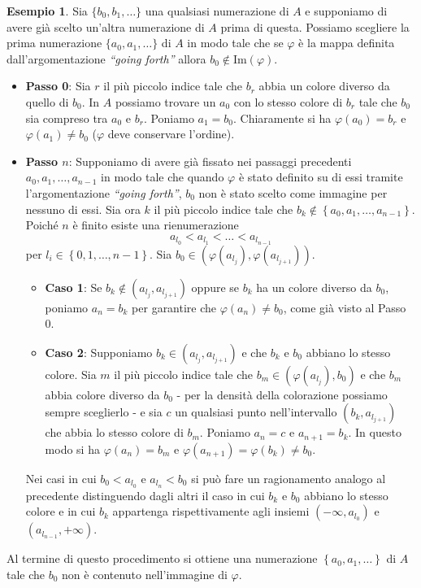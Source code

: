 \documentclass[12pt,a4paper,openright]{report}
\newcommand{\0}{\setminus\{0\}} %
\theoremstyle{definition}
\newtheorem{es}[defn]{Esempio}
\theoremstyle{plain}
\begin{document}
\begin{es}
    \medskip Sia $\{b_0,b_1,\dotsc\}$ una qualsiasi numerazione di $A$ e supponiamo di avere già scelto un'altra numerazione di $A$ prima di questa. Possiamo scegliere la prima numerazione $\{a_0,a_1,\dotsc\}$ di $A$ in modo tale che se $\varphi$ è la mappa definita dall'argomentazione \emph{``going forth''} allora $b_0 \notin \mathrm{Im}(\varphi)$.
    \begin{itemize}
        \item[] \textbf{Passo 0}: Sia $r$ il più piccolo indice tale che $b_r$ abbia un colore diverso da quello di $b_0$. In $A$ possiamo trovare un $a_0$ con lo stesso colore di $b_r$ tale che $b_0$ sia compreso tra $a_0$ e $b_r$. Poniamo $a_1=b_0$. Chiaramente si ha $\varphi(a_0)=b_r$ e $\varphi(a_1) \neq b_0$ ($\varphi$ deve conservare l'ordine).
        \item[] \textbf{Passo $n$}: Supponiamo di avere già fissato nei passaggi precedenti $a_0,a_1,\dotsc,a_{n-1}$ in modo tale che quando $\varphi$ è stato definito su di essi tramite l'argomentazione \emph{``going forth''}, $b_0$ non è stato scelto come immagine per nessuno di essi. Sia ora $k$ il più piccolo indice tale che $b_k \notin \left\lbrace a_0,a_1,\dotsc,a_{n-1}\right\rbrace$. Poiché $n$ è finito esiste una rienumerazione 
        \[a_{l_0}<a_{l_1}<\dotsc<a_{l_{n-1}}\]
        per $l_i \in \left\lbrace 0,1,\dotsc,n-1\right\rbrace$. Sia $b_0 \in \left(\varphi(a_{l_j}),\varphi(a_{l_{j+1}})\right)$.
        \begin{itemize}
        \item[] \textbf{Caso 1}: Se $b_k \notin \left(a_{l_j},a_{l_{j+1}}\right)$ oppure se $b_k$ ha un colore diverso da $b_0$, poniamo $a_n=b_k$ per garantire che $\varphi(a_n)\neq b_0$, come già visto al Passo 0.
        \item[] \textbf{Caso 2}: Supponiamo $b_k \in \left(a_{l_j},a_{l_{j+1}}\right)$ e che $b_k$ e $b_0$ abbiano lo stesso colore. Sia $m$ il più piccolo indice tale che $b_m \in \left(\varphi(a_{l_j}),b_0\right)$ e che $b_m$ abbia colore diverso da $b_0$ - per la densità della colorazione possiamo sempre sceglierlo - e sia $c$ un qualsiasi punto nell'intervallo $\left(b_k,a_{l_{j+1}}\right)$ che abbia lo stesso colore di $b_m$. Poniamo $a_n=c$ e $a_{n+1}=b_k$. In questo modo si ha $\varphi(a_n)=b_m$ e $\varphi(a_{n+1})=\varphi(b_k) \neq b_0$.
        \end{itemize}
        Nei casi in cui $b_0<a_{l_0}$ e $a_{l_n}<b_0$ si può fare un ragionamento analogo al precedente distinguendo dagli altri il caso in cui $b_k$ e $b_0$ abbiano lo stesso colore e in cui $b_k$ appartenga rispettivamente agli insiemi $(-\infty,a_{l_0})$ e $(a_{l_{n-1}},+\infty)$.
    \end{itemize}
    Al termine di questo procedimento si ottiene una numerazione $\left\lbrace a_0,a_1,\dotsc \right\rbrace$ di $A$ tale che $b_0$ non è contenuto nell'immagine di $\varphi$.
\end{es}
\end{document}
